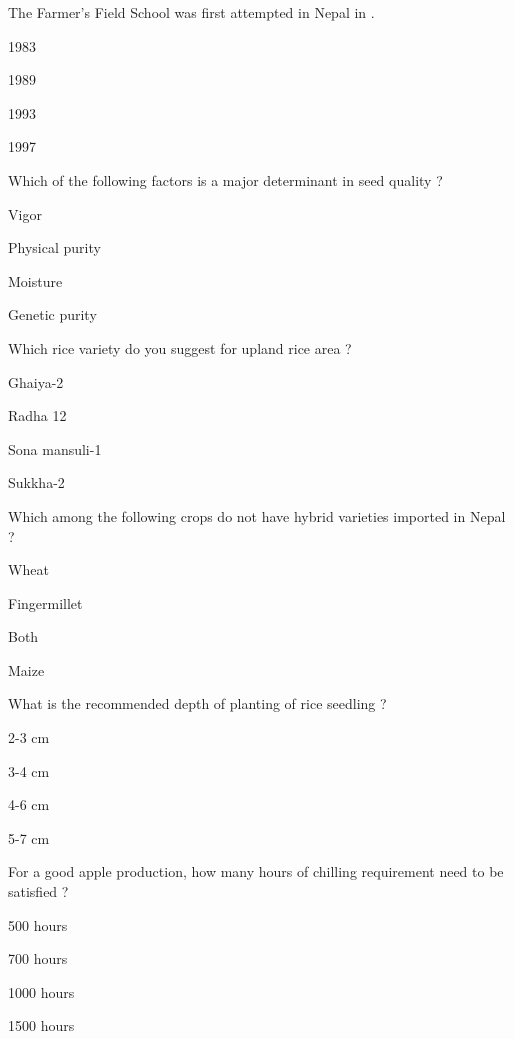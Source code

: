 \begin{questions}
\question The Farmer's Field School was first attempted in Nepal in \fillin[][3cm].
\begin{items}
\item 1983
\item 1989
\item 1993
\item* 1997
\end{items}

\question Which of the following factors is a major determinant in seed quality ?
\begin{items}
\item Vigor
\item Physical purity
\item Moisture
\item* Genetic purity
\end{items}

\question Which rice variety do you suggest for upland rice area ?
\begin{items}
\item* Ghaiya-2
\item Radha 12
\item Sona mansuli-1
\item Sukkha-2
\end{items}

\question Which among the following crops do not have hybrid varieties imported in Nepal ?
\begin{items}
\item Wheat
\item Fingermillet
\item* Both
\item Maize
\end{items}

\question What is the recommended depth of planting of rice seedling ?
\begin{items}
\item* 2-3 cm
\item 3-4 cm
\item 4-6 cm
\item 5-7 cm
\end{items}

\question For a good apple production, how many hours of chilling requirement need to be satisfied ?
\begin{items}
\item 500 hours
\item 700 hours
\item* 1000 hours
\item 1500 hours
\end{items}


\end{questions}
